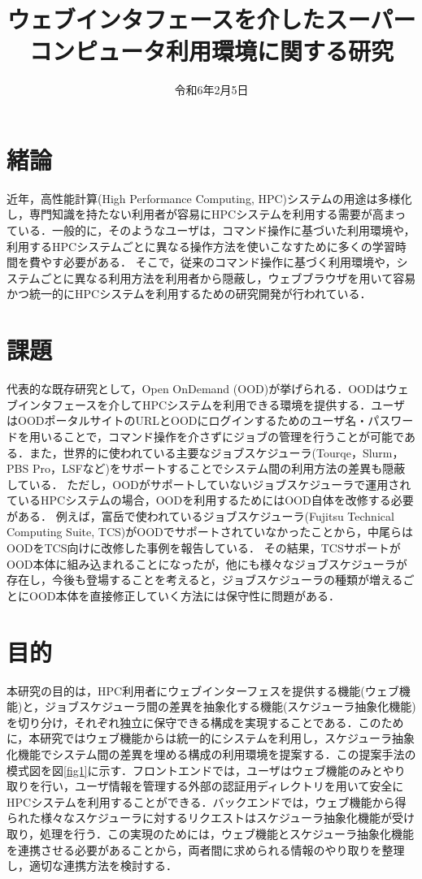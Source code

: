 \documentclass[a4paper,oneside,twocolumn,notitlepage,dvipdfmx]{jsarticle}
\date{令和6年2月5日}
\title{ウェブインタフェースを介したスーパーコンピュータ利用環境に関する研究}
\begin{document}
\maketitle
\section{緒論}
近年，高性能計算(High Performance Computing, HPC)システムの用途は多様化し，専門知識を持たない利用者が容易にHPCシステムを利用する需要が高まっている．一般的に，そのようなユーザは，コマンド操作に基づいた利用環境や，利用するHPCシステムごとに異なる操作方法を使いこなすために多くの学習時間を費やす必要がある．
そこで，従来のコマンド操作に基づく利用環境や，システムごとに異なる利用方法を利用者から隠蔽し，ウェブブラウザを用いて容易かつ統一的にHPCシステムを利用するための研究開発が行われている．\par

\section{課題}
代表的な既存研究として，Open OnDemand (OOD)が挙げられる\cite{citation_2}\cite{citation_3}．OODはウェブインタフェースを介してHPCシステムを利用できる環境を提供する．ユーザはOODポータルサイトのURLとOODにログインするためのユーザ名・パスワードを用いることで，コマンド操作を介さずにジョブの管理を行うことが可能である．また，世界的に使われている主要なジョブスケジューラ(Tourqe，Slurm，PBS Pro，LSFなど)をサポートすることでシステム間の利用方法の差異も隠蔽している．
ただし，OODがサポートしていないジョブスケジューラで運用されているHPCシステムの場合，OODを利用するためにはOOD自体を改修する必要がある．
例えば，富岳で使われているジョブスケジューラ(Fujitsu Technical Computing Suite, TCS)がOODでサポートされていなかったことから，中尾らはOODをTCS向けに改修した事例を報告している\cite{citation_1}．
その結果，TCSサポートがOOD本体に組み込まれることになったが，他にも様々なジョブスケジューラが存在し，今後も登場することを考えると，ジョブスケジューラの種類が増えるごとにOOD本体を直接修正していく方法には保守性に問題がある．\par

\section{目的}
本研究の目的は，HPC利用者にウェブインターフェスを提供する機能(ウェブ機能)と，ジョブスケジューラ間の差異を抽象化する機能(スケジューラ抽象化機能)を切り分け，それぞれ独立に保守できる構成を実現することである．このために，本研究ではウェブ機能からは統一的にシステムを利用し，スケジューラ抽象化機能でシステム間の差異を埋める構成の利用環境を提案する．この提案手法の模式図を図\ref{fig1}に示す．フロントエンドでは，ユーザはウェブ機能のみとやり取りを行い，ユーザ情報を管理する外部の認証用ディレクトリを用いて安全にHPCシステムを利用することができる．バックエンドでは，ウェブ機能から得られた様々なスケジューラに対するリクエストはスケジューラ抽象化機能が受け取り，処理を行う．この実現のためには，ウェブ機能とスケジューラ抽象化機能を連携させる必要があることから，両者間に求められる情報のやり取りを整理し，適切な連携方法を検討する．\par
\end{document}
